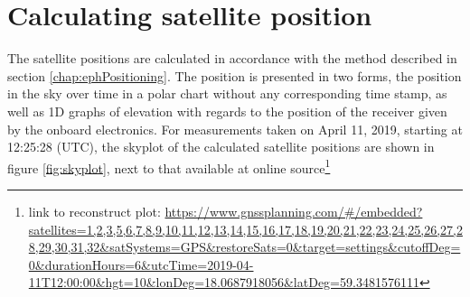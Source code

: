 \section{Calculating satellite position}\label{satelliteTrajectory}
The satellite positions are calculated in accordance with the method described in section \ref{chap:ephPositioning}. The position is presented in two forms, the position in the sky over time in a polar chart without any corresponding time stamp, as well as 1D graphs of  elevation with regards to the position of the receiver given by the onboard electronics. For measurements taken on April 11, 2019, starting at 12:25:28 (UTC), the skyplot of the calculated satellite positions are shown in figure \ref{fig:skyplot}, next to that available at online source\footnote{link to reconstruct plot: 
\url{https://www.gnssplanning.com/\#/embedded?satellites=1,2,3,5,6,7,8,9,10,11,12,13,14,15,16,17,18,19,20,21,22,23,24,25,26,27,28,29,30,31,32&satSystems=GPS&restoreSats=0&target=settings&cutoffDeg=0&durationHours=6&utcTime=2019-04-11T12:00:00&hgt=10&lonDeg=18.0687918056&latDeg=59.3481576111}
}
